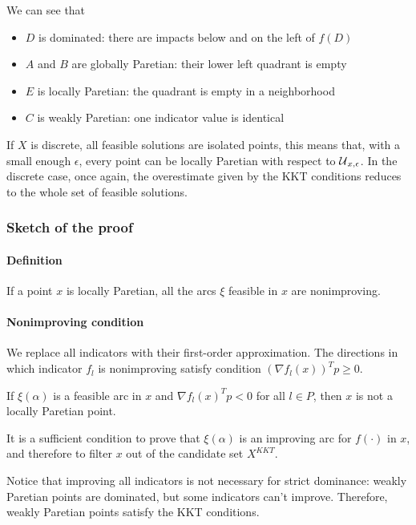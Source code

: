 We can see that
\begin{itemize}
	\item $D$ is dominated: there are impacts below and on the left of $f(D)$
	
	\item $A$ and $B$ are globally Paretian: their lower left quadrant is empty
	
	\item $E$ is locally Paretian: the quadrant is empty in a neighborhood
	
	\item $C$ is weakly Paretian: one indicator value is identical
\end{itemize}

If $X$ is discrete, all feasible solutions are isolated points, this means that, with a small enough $\epsilon$, every point can be locally Paretian with respect to $\operatorname{\mathcal{U}}_{x, \epsilon}$. In the discrete case, once again, the overestimate given by the KKT conditions reduces to the whole set of feasible solutions.

\subsubsection{Sketch of the proof}

\paragraph{Definition} If a point $x$ is locally Paretian, all the arcs $\xi$ feasible in $x$ are nonimproving.

\paragraph{Nonimproving condition} We replace all indicators with their first-order approximation. The directions in which indicator $f_l$ is nonimproving satisfy condition $(\nabla f_l (x))^T p \geq 0$.\\

\begin{theo}
	If $\xi (\alpha)$ is a feasible arc in $x$ and $\nabla f_l (x)^T p < 0$ for all $l \in P$, then $x$ is not a locally Paretian point.
\end{theo}

It is a sufficient condition to prove that $\xi(\alpha)$ is an improving arc for $f(\cdot)$ in $x$, and therefore to filter $x$ out of the candidate set $X^{KKT}$.

Notice that improving all indicators is not necessary for strict dominance: weakly Paretian points are dominated, but some indicators can't improve. Therefore, weakly Paretian points satisfy the KKT conditions.

